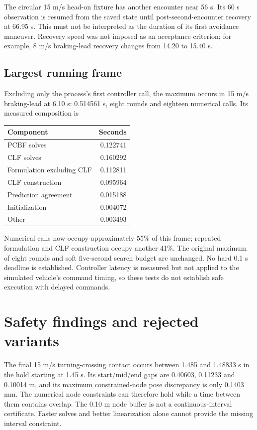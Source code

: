 \documentclass[11pt]{article}
\begin{document}
The circular 15 m/s head-on fixture has another encounter near 56 s. Its
60 s observation is resumed from the saved state until post-second-encounter
recovery at 66.95 s. This must not be interpreted as the duration of its first
avoidance maneuver. Recovery speed was not imposed as an acceptance criterion;
for example, 8 m/s braking-lead recovery changes from 14.20 to 15.40 s.

\subsection{Largest running frame}
Excluding only the process's first controller call, the maximum occurs in
15 m/s braking-lead at 6.10 s: 0.514561 s, eight rounds and eighteen numerical
calls. Its measured composition is
\begin{center}\begin{tabular}{lr}\toprule
Component & Seconds\\\midrule
PCBF solves & 0.122741\\
CLF solves & 0.160292\\
Formulation excluding CLF & 0.112811\\
CLF construction & 0.095964\\
Prediction agreement & 0.015188\\
Initialization & 0.004072\\
Other & 0.003493\\
\bottomrule\end{tabular}\end{center}
Numerical calls now occupy approximately 55\% of this frame; repeated
formulation and CLF construction occupy another 41\%. The original maximum
of eight rounds and soft five-second search budget are unchanged. No hard
0.1 s deadline is established. Controller latency is measured but not applied
to the simulated vehicle's command timing, so these tests do not establish
safe execution with delayed commands.

\section{Safety findings and rejected variants}
The final 15 m/s turning-crossing contact occurs between 1.485 and
1.48833 s in the hold starting at 1.45 s. Its start/mid/end gaps are
0.40603, 0.11233 and 0.10014 m, and its maximum constrained-node pose discrepancy
is only 0.1403 mm. The numerical node constraints can therefore hold while a
time between them contains overlap. The 0.10 m node buffer is not a
continuous-interval certificate. Faster solves and better linearization alone
cannot provide the missing interval constraint.
\end{document}
